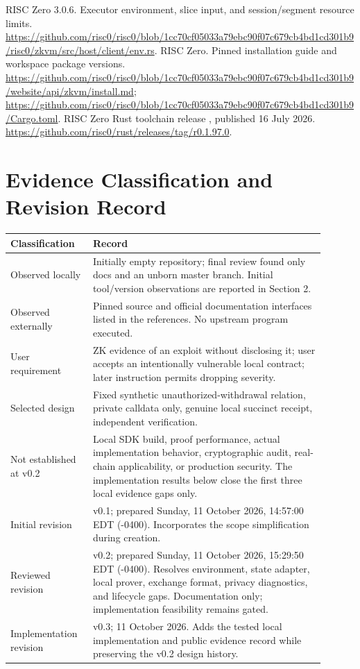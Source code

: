 \documentclass[11pt]{article}
\newcommand{\initialtimestamp}{Sunday, 11 October 2026, 14:57:00 EDT (-0400)}
\newcommand{\preparedtimestamp}{Sunday, 11 October 2026, 15:29:50 EDT (-0400)}
\begin{document}
\begin{thebibliography}{99}
 RISC Zero 3.0.6. Executor environment, slice input, and session/segment resource limits. \url{https://github.com/risc0/risc0/blob/1cc70cf05033a79ebc90f07c679cb4bd1cd301b9/risc0/zkvm/src/host/client/env.rs}.
 RISC Zero. Pinned installation guide and workspace package versions. \url{https://github.com/risc0/risc0/blob/1cc70cf05033a79ebc90f07c679cb4bd1cd301b9/website/api/zkvm/install.md}; \url{https://github.com/risc0/risc0/blob/1cc70cf05033a79ebc90f07c679cb4bd1cd301b9/Cargo.toml}.
 RISC Zero Rust toolchain release , published 16 July 2026. \url{https://github.com/risc0/rust/releases/tag/r0.1.97.0}.
\end{thebibliography}

\appendix
\section{Evidence Classification and Revision Record}
\begin{longtable}{L{0.22\linewidth}L{0.68\linewidth}}
\toprule
\textbf{Classification} & \textbf{Record} \\
\midrule
\endhead
Observed locally & Initially empty repository; final review found only docs and an unborn master branch. Initial tool/version observations are reported in Section 2. \\
Observed externally & Pinned source and official documentation interfaces listed in the references. No upstream program executed. \\
User requirement & ZK evidence of an exploit without disclosing it; user accepts an intentionally vulnerable local contract; later instruction permits dropping severity. \\
Selected design & Fixed synthetic unauthorized-withdrawal relation, private calldata only, genuine local succinct receipt, independent verification. \\
Not established at v0.2 & Local SDK build, proof performance, actual implementation behavior, cryptographic audit, real-chain applicability, or production security. The implementation results below close the first three local evidence gaps only. \\
Initial revision & v0.1; prepared \initialtimestamp. Incorporates the scope simplification during creation. \\
Reviewed revision & v0.2; prepared \preparedtimestamp. Resolves environment, state adapter, local prover, exchange format, privacy diagnostics, and lifecycle gaps. Documentation only; implementation feasibility remains gated. \\
Implementation revision & v0.3; 11 October 2026. Adds the tested local implementation and public evidence record while preserving the v0.2 design history. \\
\bottomrule
\end{longtable}
\end{document}
